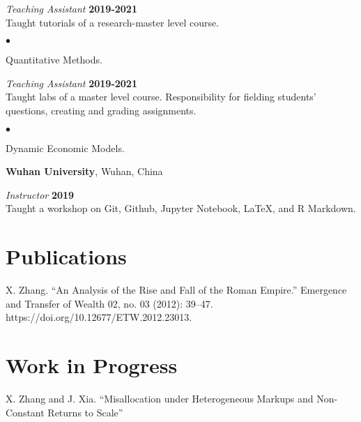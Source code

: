 \documentclass[margin,line]{res}
\newenvironment{list2}{
  \begin{list}{$\bullet$}{%
      \setlength{\itemsep}{0in}
      \setlength{\parsep}{0in} \setlength{\parskip}{0in}
      \setlength{\topsep}{0in} \setlength{\partopsep}{0in} 
      \setlength{\leftmargin}{0.2in}}}{\end{list}}
\begin{document}
\begin{resume}
\vspace{-.3cm}
{\em Teaching Assistant} \hfill {\bf 2019-2021}\\
Taught tutorials of a research-master level course. 
\begin{list2}
\item Quantitative Methods.
\end{list2}

\vspace{-.3cm}
{\em Teaching Assistant} \hfill {\bf 2019-2021}\\
Taught labs of a master level course. Responsibility for fielding students' questions, creating and grading assignments.  
\begin{list2}
\item Dynamic Economic Models.
\end{list2}

{\bf Wuhan University}, Wuhan, China

\vspace{-.3cm}
{\em Instructor} \hfill {\bf 2019}\\
Taught a workshop on Git, Github, Jupyter Notebook, \LaTeX, and R Markdown.

\section{\sc Publications}
X. Zhang. ``An Analysis of the Rise and Fall of the Roman Empire.'' Emergence and Transfer of Wealth 02, no. 03 (2012): 39–47.
https://doi.org/10.12677/ETW.2012.23013.


\section{\sc Work in Progress}
X. Zhang and J. Xia. ``Misallocation under Heterogeneous Markups and Non-Constant Returns to Scale''


\end{resume}
\end{document}
